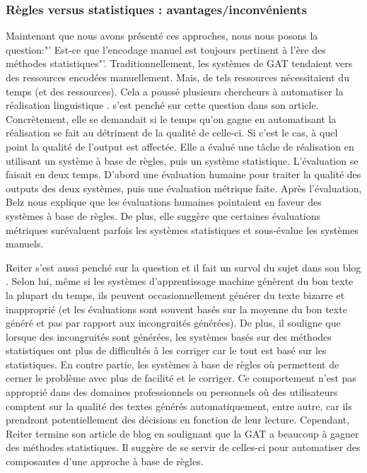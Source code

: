 \subsubsection{Règles versus statistiques : avantages/inconvénients}

Maintenant que nous avons présenté ces approches, nous nous posons la question:"' Est-ce que l'encodage manuel est toujours pertinent à l'ère des méthodes statistiques"'. Traditionnellement, les systèmes de \ac{GAT} tendaient vers des ressources encodées manuellement. Mais, de tels ressources nécessitaient du temps (et des ressources). Cela a poussé plusieurs chercheurs à automatiser la réalisation linguistique \citep{LangkildeForestbasedStatisticalSentence2000}.\cite{BelzSystemBuildingCost2009} s'est penché sur cette question dans son article. Concrètement, elle se demandait si le temps qu'on gagne en automatisant la réalisation se fait au détriment de la qualité de celle-ci. Si c'est le cas, à quel point la qualité de l'output est affectée. Elle a évalué une tâche de réalisation en utilisant un système à base de règles, puis un système statistique. L'évaluation se faisait en deux temps. D'abord une évaluation humaine pour traiter la qualité des outputs des deux systèmes, puis une évaluation métrique faite. Après l'évaluation, Belz nous explique que les évaluations humaines pointaient en faveur des systèmes à base de règles. De plus, elle suggère que certaines évaluations métriques surévaluent parfois les systèmes statistiques et sous-évalue les systèmes manuels\citep{BelzSystemBuildingCost2009}. 

Reiter s'est aussi penché sur la question et il fait un survol du sujet dans son blog \cite{ReiterNaturalLanguageGeneration2016} . Selon lui, même si les systèmes d'apprentissage machine génèrent du bon texte la plupart du temps, ils peuvent occasionnellement générer du texte bizarre et inapproprié (et les évaluations sont souvent basés sur la moyenne du bon texte généré et pas par rapport aux incongruités générées). De plus, il souligne que lorsque des incongruités sont générées, les systèmes basés sur des méthodes statistiques ont plus de difficultés à les corriger car le tout est basé sur les statistiques. En contre partie, les systèmes à base de règles où permettent de cerner le problème avec plus de facilité et le corriger. Ce comportement n'est pas approprié dans des domaines professionnels ou personnels où des utilisateurs comptent sur la qualité des textes générés automatiquement, entre autre, car ils prendront potentiellement des décisions en fonction de leur lecture. Cependant, Reiter termine son article de blog en soulignant que la \ac{GAT} a beaucoup à gagner des méthodes statistiques. Il suggère de se servir de celles-ci pour automatiser des composantes d'une approche à base de règles.

